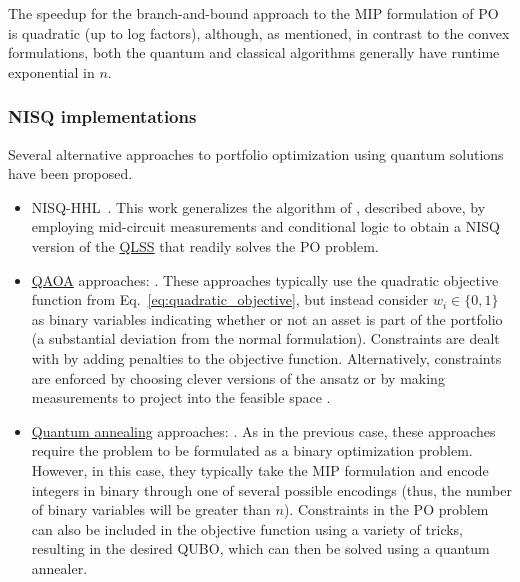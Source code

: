 \begin{refsection}
The speedup for the branch-and-bound approach to the MIP formulation of PO is quadratic (up to log factors), although, as mentioned, in contrast to the convex formulations, both the quantum and classical algorithms generally have runtime exponential in $n$. 


\subsubsection*{NISQ implementations}
Several alternative approaches to portfolio optimization using quantum solutions have been proposed.
\begin{itemize}
    \item NISQ-HHL~\cite{yalovetzky2021nisqHHL}. This work generalizes the algorithm of \cite{rebentrost2018QuantumFinance}, described above, by employing mid-circuit measurements and conditional logic to obtain a NISQ version of the \hyperref[prim:QuantumLinearSystemSolvers]{QLSS} that readily solves the PO problem.
    \item \hyperref[prim:VQA]{QAOA} approaches: 
\cite{brandhofer2022benchmarking,herman2022portfolio,baker2022wasserstein}
    . These approaches typically use the quadratic objective function from Eq.~\eqref{eq:quadratic_objective}, but instead consider $w_i \in \{0,1\}$ as binary variables indicating whether or not an asset is part of the portfolio (a substantial deviation from the normal formulation). Constraints are dealt with by adding penalties to the objective function.  Alternatively, constraints are enforced by choosing clever versions of the ansatz \cite{niroula2022constrained} or by making measurements to project into the feasible space \cite{herman2022portfolio}.
    \item \hyperref[prim:QuantumAdiabaticAlgorithm]{Quantum annealing} approaches: \cite{rosenberg2016tradingQuantumAnnealing,palmer2022financial,palmer2021POwithBands,grant2021benchmarking,mugel2022dynamic}. As in the previous case, these approaches require the problem to be formulated as a binary optimization problem. However, in this case, they typically take the MIP formulation and encode integers in binary through one of several possible encodings \cite{rosenberg2016tradingQuantumAnnealing} (thus, the number of binary variables will be greater than $n$).   Constraints in the PO problem can also be included in the objective function using a variety of tricks, resulting in the desired QUBO, which can then be solved using a quantum annealer.
\end{itemize}


\end{refsection}
